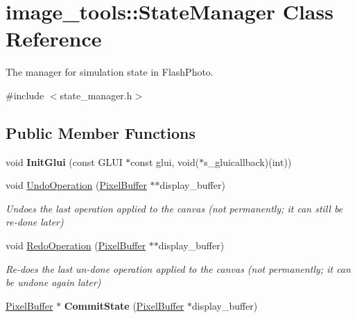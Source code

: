 \hypertarget{classimage__tools_1_1StateManager}{}\section{image\+\_\+tools\+:\+:State\+Manager Class Reference}
\label{classimage__tools_1_1StateManager}


The manager for simulation state in Flash\+Photo.  




{\ttfamily \#include $<$state\+\_\+manager.\+h$>$}

\subsection*{Public Member Functions}
\begin{DoxyCompactItemize}
\item 
void {\bfseries Init\+Glui} (const G\+L\+UI $\ast$const glui, void($\ast$s\+\_\+gluicallback)(int))\hypertarget{classimage__tools_1_1StateManager_ac386ffcf7c1c43570ef07e5a67bf01ac}{}\label{classimage__tools_1_1StateManager_ac386ffcf7c1c43570ef07e5a67bf01ac}

\item 
void \hyperlink{classimage__tools_1_1StateManager_a145acd832974e75bfcf36fde5d346262}{Undo\+Operation} (\hyperlink{classimage__tools_1_1PixelBuffer}{Pixel\+Buffer} $\ast$$\ast$display\+\_\+buffer)\hypertarget{classimage__tools_1_1StateManager_a145acd832974e75bfcf36fde5d346262}{}\label{classimage__tools_1_1StateManager_a145acd832974e75bfcf36fde5d346262}

\begin{DoxyCompactList}\small\item\em Undoes the last operation applied to the canvas (not permanently; it can still be re-\/done later) \end{DoxyCompactList}\item 
void \hyperlink{classimage__tools_1_1StateManager_a7567b735bfaf0cf9075bf85358d23510}{Redo\+Operation} (\hyperlink{classimage__tools_1_1PixelBuffer}{Pixel\+Buffer} $\ast$$\ast$display\+\_\+buffer)\hypertarget{classimage__tools_1_1StateManager_a7567b735bfaf0cf9075bf85358d23510}{}\label{classimage__tools_1_1StateManager_a7567b735bfaf0cf9075bf85358d23510}

\begin{DoxyCompactList}\small\item\em Re-\/does the last un-\/done operation applied to the canvas (not permanently; it can be undone again later) \end{DoxyCompactList}\item 
\hyperlink{classimage__tools_1_1PixelBuffer}{Pixel\+Buffer} $\ast$ {\bfseries Commit\+State} (\hyperlink{classimage__tools_1_1PixelBuffer}{Pixel\+Buffer} $\ast$display\+\_\+buffer)\hypertarget{classimage__tools_1_1StateManager_a739110673567bdae3826d597192443eb}{}\label{classimage__tools_1_1StateManager_a739110673567bdae3826d597192443eb}

\end{DoxyCompactItemize}
